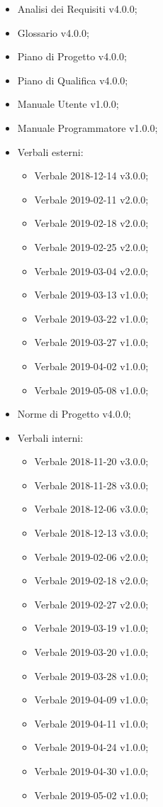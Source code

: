 \documentclass[a4paper,12pt]{article}
\begin{document}
\begin{itemize}
\item Analisi dei Requisiti v4.0.0;
\item Glossario v4.0.0;
\item Piano di Progetto v4.0.0;
\item Piano di Qualifica v4.0.0;
\item Manuale Utente v1.0.0;
\item Manuale Programmatore v1.0.0;
\item Verbali esterni:
	\begin{itemize}
		\item Verbale 2018-12-14 v3.0.0;
		\item Verbale 2019-02-11 v2.0.0;
		\item Verbale 2019-02-18 v2.0.0;
		\item Verbale 2019-02-25 v2.0.0;
		\item Verbale 2019-03-04 v2.0.0;
		\item Verbale 2019-03-13 v1.0.0;
		\item Verbale 2019-03-22 v1.0.0;
		\item Verbale 2019-03-27 v1.0.0;
		\item Verbale 2019-04-02 v1.0.0;
		\item Verbale 2019-05-08 v1.0.0;
	\end{itemize}
\item Norme di Progetto v4.0.0;
\item Verbali interni:
	\begin{itemize}
		\item Verbale 2018-11-20 v3.0.0;
		\item Verbale 2018-11-28 v3.0.0;
		\item Verbale 2018-12-06 v3.0.0;
		\item Verbale 2018-12-13 v3.0.0;
		\item Verbale 2019-02-06 v2.0.0;
		\item Verbale 2019-02-18 v2.0.0;
		\item Verbale 2019-02-27 v2.0.0;
		\item Verbale 2019-03-19 v1.0.0;
		\item Verbale 2019-03-20 v1.0.0;
		\item Verbale 2019-03-28 v1.0.0;
		\item Verbale 2019-04-09 v1.0.0;
		\item Verbale 2019-04-11 v1.0.0;
		\item Verbale 2019-04-24 v1.0.0;
		\item Verbale 2019-04-30 v1.0.0;
		\item Verbale 2019-05-02 v1.0.0;
	\end{itemize}
\end{itemize}
\end{document}
